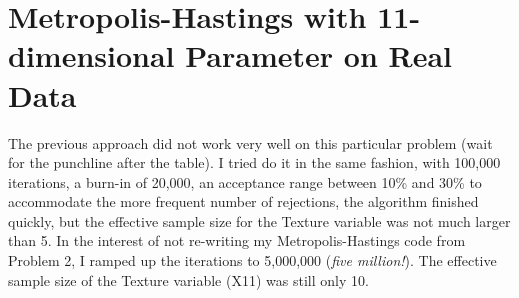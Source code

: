 \documentclass[12pt]{article}
\begin{document}
\section*{Metropolis-Hastings with 11-dimensional Parameter on Real Data}
The previous approach did not work very well on this particular problem (wait for the punchline after the table). I tried do it in the same fashion, with 100,000 iterations, a burn-in of 20,000, an acceptance range between 10\% and 30\% to accommodate the more frequent number of rejections, the algorithm finished quickly, but the effective sample size for the Texture variable was not much larger than 5. In the interest of not re-writing my Metropolis-Hastings code from Problem 2, I ramped up the iterations to 5,000,000 (\emph{five million!}). The effective sample size of the Texture variable (X11) was still only 10.
\end{document}
